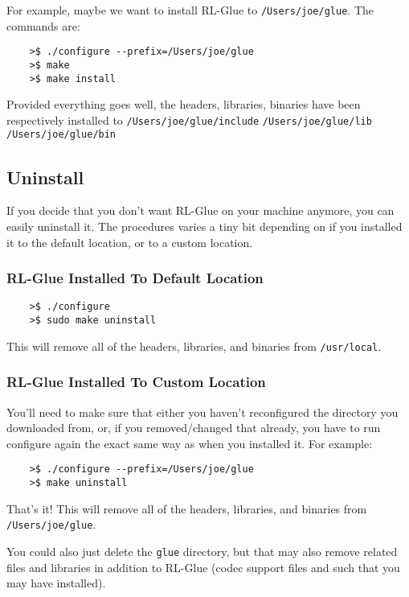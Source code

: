 \documentclass[11pt]{article}
\begin{document}
For example, maybe we want to install RL-Glue to \texttt{/Users/joe/glue}.  The commands are:
\begin{verbatim}
	>$ ./configure --prefix=/Users/joe/glue
	>$ make
	>$ make install
\end{verbatim}

Provided everything goes well, the headers, libraries, binaries have been respectively installed to\newline
\texttt{/Users/joe/glue/include}\newline
\texttt{/Users/joe/glue/lib}\newline
\texttt{/Users/joe/glue/bin}


\subsection{Uninstall}
If you decide that you don't want  RL-Glue on your machine anymore, you can easily uninstall it.  The procedures varies a tiny bit depending on if you installed it to the default location, or to a custom location.

\subsubsection{RL-Glue Installed To Default Location}
\begin{verbatim}
	>$ ./configure
	>$ sudo make uninstall
\end{verbatim}

This will remove all of the headers, libraries, and binaries from \texttt{/usr/local}.

\subsubsection{RL-Glue Installed To Custom Location}
You'll need to make sure that either you haven't reconfigured the directory you downloaded from, or, if you removed/changed that already, you have to run configure again the exact same way as when you installed it.  For example:
\begin{verbatim}
	>$ ./configure --prefix=/Users/joe/glue
	>$ make uninstall
\end{verbatim}

That's it!  This will remove all of the headers, libraries, and binaries from \texttt{/Users/joe/glue}.

You could also just delete the \texttt{glue} directory, but that may also remove related files and libraries in addition to RL-Glue (codec support files and such that you may have installed).
\end{document}
